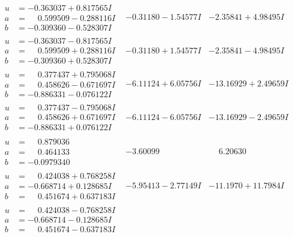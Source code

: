 \documentclass[1p]{elsarticle_modified}
\theoremstyle{definition}
\begin{document}
$$\begin{array}{c|c|c}
\begin{aligned}
u &= -0.363037 + 0.817565 I \\
a &= \phantom{-}0.599509 - 0.288116 I \\
b &= -0.309360 - 0.528307 I\end{aligned}
 & -0.31180 - 1.54577 I & -2.35841 + 4.98495 I \\ \hline\begin{aligned}
u &= -0.363037 - 0.817565 I \\
a &= \phantom{-}0.599509 + 0.288116 I \\
b &= -0.309360 + 0.528307 I\end{aligned}
 & -0.31180 + 1.54577 I & -2.35841 - 4.98495 I \\ \hline\begin{aligned}
u &= \phantom{-}0.377437 + 0.795068 I \\
a &= \phantom{-}0.458626 - 0.671697 I \\
b &= -0.886331 - 0.076122 I\end{aligned}
 & -6.11124 + 6.05756 I & -13.16929 + 2.49659 I \\ \hline\begin{aligned}
u &= \phantom{-}0.377437 - 0.795068 I \\
a &= \phantom{-}0.458626 + 0.671697 I \\
b &= -0.886331 + 0.076122 I\end{aligned}
 & -6.11124 - 6.05756 I & -13.16929 - 2.49659 I \\ \hline\begin{aligned}
u &= \phantom{-}0.879036\phantom{ +0.000000I} \\
a &= \phantom{-}0.464133\phantom{ +0.000000I} \\
b &= -0.0979340\phantom{ +0.000000I}\end{aligned}
 & -3.60099\phantom{ +0.000000I} & \phantom{-}6.20630\phantom{ +0.000000I} \\ \hline\begin{aligned}
u &= \phantom{-}0.424038 + 0.768258 I \\
a &= -0.668714 + 0.128685 I \\
b &= \phantom{-}0.451674 + 0.637183 I\end{aligned}
 & -5.95413 - 2.77149 I & -11.1970 + 11.7984 I \\ \hline\begin{aligned}
u &= \phantom{-}0.424038 - 0.768258 I \\
a &= -0.668714 - 0.128685 I \\
b &= \phantom{-}0.451674 - 0.637183 I\end{aligned}

\end{array}$$
\end{document}
